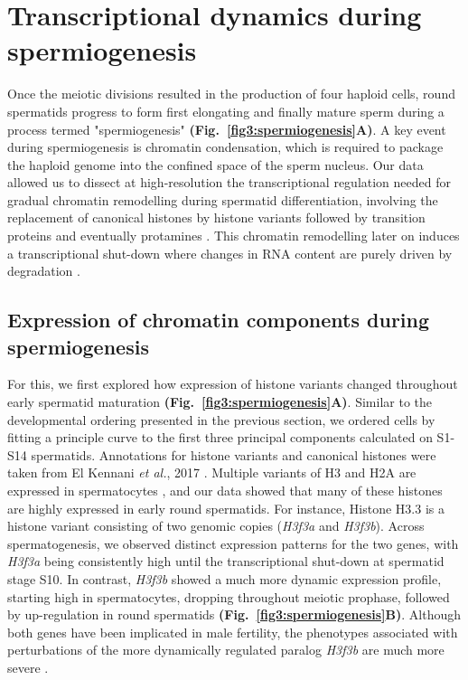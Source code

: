 \section{Transcriptional dynamics during spermiogenesis}
\label{sec3:spermiogenesis}

Once the meiotic divisions resulted in the production of four haploid cells, round spermatids progress to form first elongating and finally mature sperm during a process termed "spermiogenesis" \textbf{(Fig.~\ref{fig3:spermiogenesis}A)}. A key event during spermiogenesis is chromatin condensation, which is required to package the haploid genome into the confined space of the sperm nucleus. Our data allowed us to dissect at high-resolution the transcriptional regulation needed for gradual chromatin remodelling during spermatid differentiation, involving the replacement of canonical histones by histone variants followed by transition proteins and eventually protamines \citep{Balhorn2007, Kennani2017}. This chromatin remodelling later on induces a transcriptional shut-down where changes in RNA content are purely driven by degradation \citep{Steger1999}.

\subsection{Expression of chromatin components during spermiogenesis}

For this, we first explored how expression of histone variants changed throughout early spermatid maturation \textbf{(Fig.~\ref{fig3:spermiogenesis}A)}. Similar to the developmental ordering presented in the previous section, we ordered cells by fitting a principle curve to the first three principal components calculated on S1-S14 spermatids. Annotations for histone variants and canonical histones were taken from El Kennani \emph{et al.}, 2017 \citep{Kennani2017}. Multiple variants of H3 and H2A are expressed in spermatocytes \citep{Greaves2006, Mahadevaiah2001, Tang2015}, and our data showed that many of these histones are highly expressed in early round spermatids. For instance, Histone H3.3 is a histone variant consisting of two genomic copies (\textit{H3f3a} and \textit{H3f3b}). Across spermatogenesis, we observed distinct expression patterns for the two genes, with \textit{H3f3a} being consistently high until the transcriptional shut-down at spermatid stage S10. In contrast, \textit{H3f3b} showed a much more dynamic expression profile, starting high in spermatocytes, dropping throughout meiotic prophase, followed by up-regulation in round spermatids \textbf{(Fig.~\ref{fig3:spermiogenesis}B)}. Although both genes have been implicated in male fertility, the phenotypes associated with perturbations of the more dynamically regulated paralog \textit{H3f3b} are much more severe \citep{Tang2015, Yuen2014}.\\

